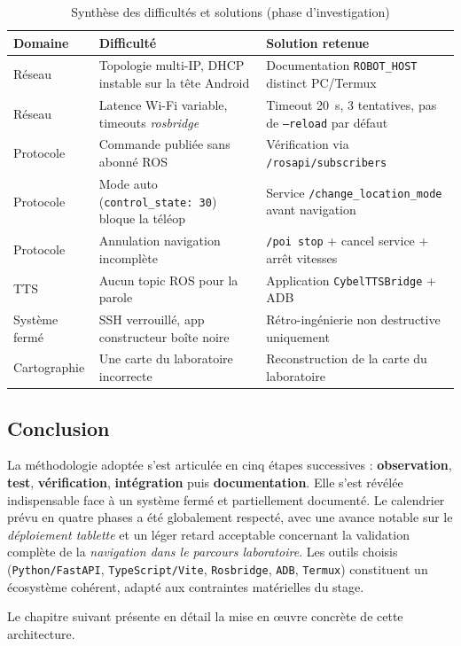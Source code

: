 \begin{table}[H]
\centering
\caption{Synthèse des difficultés et solutions (phase d'investigation)}
\label{tab:difficultes}
\small
\setlength{\tabcolsep}{3pt}
\begin{tabular}{|p{2.4cm}|p{4.0cm}|p{4.4cm}|}
\hline
\textbf{Domaine} & \textbf{Difficulté} & \textbf{Solution retenue} \\
\hline
Réseau & Topologie multi-IP, DHCP instable sur la tête Android & Documentation
\texttt{ROBOT\_HOST} distinct PC/Termux \\
\hline
Réseau & Latence Wi-Fi variable, timeouts \textit{rosbridge} & Timeout 20~s,
3 tentatives, pas de \texttt{--reload} par défaut \\
\hline
Protocole & Commande publiée sans abonné ROS & Vérification via
\texttt{/rosapi/subscribers} \\
\hline
Protocole & Mode auto (\texttt{control\_state: 30}) bloque la téléop & Service
\texttt{/change\_location\_mode} avant navigation \\
\hline
Protocole & Annulation navigation incomplète & \texttt{/poi stop} + cancel service
+ arrêt vitesses \\
\hline
TTS & Aucun topic ROS pour la parole & Application \texttt{CybelTTSBridge} + ADB \\
\hline
Système fermé & SSH verrouillé, app constructeur boîte noire & Rétro-ingénierie
non destructive uniquement \\
\hline
Cartographie & Une carte du laboratoire incorrecte & Reconstruction de la carte du laboratoire \\
\hline
\end{tabular}
\end{table}


\subsection{Conclusion}

La méthodologie adoptée s’est articulée en cinq étapes successives :
\textbf{observation}, \textbf{test}, \textbf{vérification}, \textbf{intégration} puis \textbf{documentation}.
Elle s’est révélée indispensable face à un système fermé et partiellement documenté.
Le calendrier prévu en quatre phases a été globalement respecté, 
avec une avance notable sur le \textit{déploiement tablette} 
et un léger retard acceptable concernant la validation complète de la 
\textit{navigation dans le parcours laboratoire}.
Les outils choisis (\texttt{Python/FastAPI}, \texttt{TypeScript/Vite}, 
\texttt{Rosbridge}, \texttt{ADB}, \texttt{Termux}) 
constituent un écosystème cohérent, adapté aux contraintes matérielles du stage.

Le chapitre suivant présente en détail la mise en œuvre concrète de cette architecture.